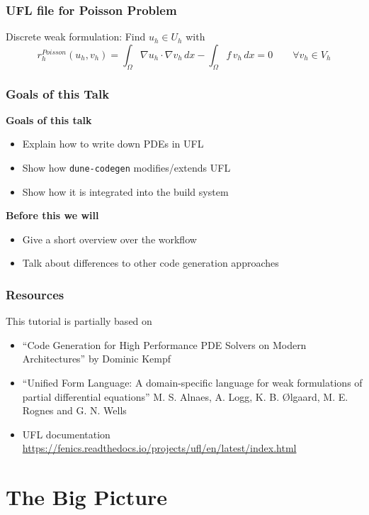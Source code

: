 \documentclass[aspectratio=169,11pt]{beamer}
\theoremstyle{definition}
\begin{document}
\begin{frame}
  \frametitle{UFL file for Poisson Problem}

  Discrete weak formulation: Find $u_h \in U_h$ with
  \begin{equation*}
    r_h^{Poisson}(u_h, v_h) = \int_\Omega \nabla u_h \cdot \nabla v_h \, dx
    - \int_\Omega f \, v_h \, dx = 0 \qquad \forall v_h \in V_h
  \end{equation*}
  
\end{frame}

\begin{frame}
  \frametitle{Goals of this Talk}

  \textbf{Goals of this talk}
  \begin{itemize}
  \item Explain how to write down PDEs in UFL
  \item Show how \lstinline{dune-codegen} modifies/extends UFL
  \item Show how it is integrated into the build system
  \end{itemize}
  \vfill
  \textbf{Before this we will}
  \begin{itemize}
  \item Give a short overview over the workflow
  \item Talk about differences to other code generation approaches
  \end{itemize}
\end{frame}

\begin{frame}
  \frametitle{Resources}
  This tutorial is partially based on
  \begin{itemize}
  \item ``Code Generation for High Performance PDE Solvers
    on Modern Architectures'' by Dominic Kempf
  \item ``Unified Form Language: A domain-specific language for weak
    formulations of partial differential equations'' M. S. Alnaes, A. Logg,
    K. B. Ølgaard, M. E. Rognes and G. N. Wells
  \item UFL documentation
    \url{https://fenics.readthedocs.io/projects/ufl/en/latest/index.html}
  \end{itemize}

\end{frame}
\section{The Big Picture}
\end{document}
